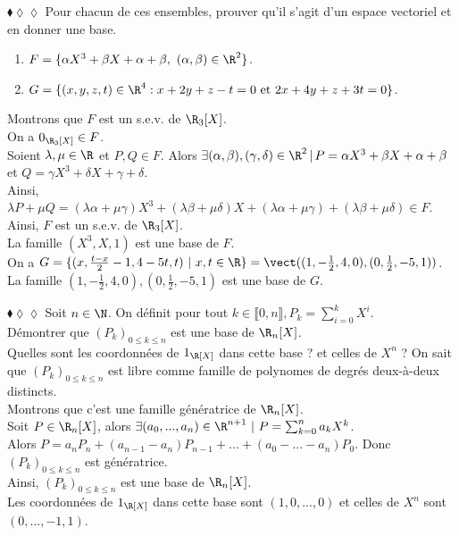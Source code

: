 \documentclass[11pt]{article}
\begin{document}
\begin{exercice}{$\blacklozenge\lozenge\lozenge$}{}
    Pour chacun de ces ensembles, prouver qu'il s'agit d'un espace vectoriel et en donner une base.
    \begin{enumerate}
        \item $F = \{\alpha X^3 + \beta X + \alpha + \beta, ~ (\alpha, \beta) \in \R^2\}$.
        \item $G = \{(x,y,z,t) \in \R^4 : x + 2y + z - t = 0 ~ \text{et} ~ 2x + 4y + z + 3t = 0\}$.
    \end{enumerate}
    \tcblower
     Montrons que $F$ est un s.e.v. de $\R_3[X]$.\\
    On a $0_{\R_3[X]} \in F$.\\
    Soient $\lambda, \mu \in \R$ et $P, Q \in F$.
    Alors $\exists (\alpha, \beta), (\gamma, \delta) \in \R^2 \, | \,  P = \alpha X^3 + \beta X + \alpha + \beta$ et $Q = \gamma X^3 + \delta X + \gamma + \delta$.\\
    Ainsi, $\lambda P + \mu Q = (\lambda\alpha + \mu\gamma)X^3 + (\lambda\beta + \mu\delta)X + (\lambda\alpha + \mu\gamma) + (\lambda\beta + \mu\delta) \in F$.\\
    Ainsi, $F$ est un s.e.v. de $\R_3[X]$.\\
    La famille $(X^3, X, 1)$ est une base de $F$.\\[0.3cm]
     On a $G = \{(x, \frac{t-x}{2} - 1, 4 - 5t, t) ~ | ~ x,t\in\R\} = \vect((1, -\frac{1}{2}, 4, 0), (0, \frac{1}{2}, -5, 1))$.\\
    La famille $(1, -\frac{1}{2}, 4, 0), (0, \frac{1}{2}, -5, 1)$ est une base de $G$.
\end{exercice}

\vspace*{-0.3cm}

\begin{exercice}{$\blacklozenge\lozenge\lozenge$}{}
    Soit $n \in \N$. On définit pour tout $k\in\llbracket 0, n \rrbracket, P_k = \sum\limits_{i=0}^k X^i$.\\
    Démontrer que $(P_k)_{0\leq k\leq n}$ est une base de $\R_n[X]$.\\
    Quelles sont les coordonnées de $1_{\R[X]}$ dans cette base ? et celles de $X^n$ ?
    \tcblower
    On sait que $(P_k)_{0\leq k\leq n}$ est libre comme famille de polynomes de degrés deux-à-deux distincts.\\
    Montrons que c'est une famille génératrice de $\R_n[X]$.\\
    Soit $P\in\R_n[X]$, alors $\exists (a_0, ..., a_n) \in \R^{n+1} ~ | ~ P = \sum_{k=0}^n a_kX^k$.\\
    Alors $P = a_n P_n + (a_{n-1} - a_n) P_{n-1} + ... + (a_0 - ... - a_n) P_0$. Donc $(P_k)_{0\leq k\leq n}$ est génératrice.\\
    Ainsi, $(P_k)_{0\leq k\leq n}$ est une base de $\R_n[X]$.\\
    Les coordonnées de $1_{\R[X]}$ dans cette base sont $(1, 0, ..., 0)$ et celles de $X^n$ sont $(0, ..., -1, 1)$.
\end{exercice}
\end{document}
